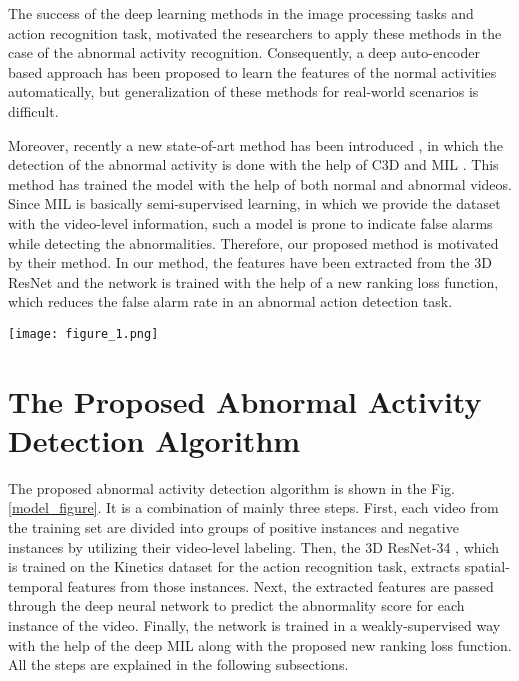 \documentclass[conference]{IEEEtran}
\begin{document}
The success of the deep learning methods in the image processing tasks \cite{A5} and action recognition \cite{A14, A13, A5} task, motivated the researchers to apply these methods in the case of the abnormal activity recognition. Consequently, a deep auto-encoder based approach \cite{A11,A15,A16} has been proposed to learn the features of the normal activities automatically, but generalization of these methods for real-world scenarios is difficult.

Moreover, recently a new state-of-art method has been introduced \cite{A6}, in which the detection of the abnormal activity is done with the help of C3D \cite{A1} and MIL \cite{A12,A24}. This method has trained the model with the help of both normal and abnormal videos. Since MIL is basically semi-supervised learning, in which we provide the dataset with the video-level information, such a model is prone to indicate false alarms while detecting the abnormalities. Therefore, our proposed method is motivated by their method. In our method, the features have been extracted from the 3D ResNet \cite{A5,A13} and the network is trained with the help of a new ranking loss function, which reduces the false alarm rate in an abnormal action detection task.  



\begin{figure*}

	\begin{center}
		\texttt{[image: figure\_1.png]}
		
	\end{center}
	\caption{The model of the proposed abnormal activity detection algorithm. Each normal and abnormal videos is divided into groups of positive instances and negative instances. Then the proposed neural network predicts the abnormality score for each instance with the help of MIL along with the new ranking loss.}
	\label{model_figure}
	
\end{figure*}
 
\section{The Proposed Abnormal Activity Detection Algorithm} \label{pa}
The proposed abnormal activity detection algorithm is shown in the Fig. \ref{model_figure}. It is a combination of mainly three steps. First, each video from the training set are divided into groups of positive instances and negative instances by utilizing their video-level labeling. Then, the 3D ResNet-34 \cite{A5,A13}, which is trained on the Kinetics dataset \cite{A23} for the action recognition task, extracts spatial-temporal features from those instances. Next, the extracted features are passed through the deep neural network to predict the abnormality score for each instance of the video. Finally, the network is trained in a weakly-supervised way with the help of the deep MIL \cite{A12,A24} along with the proposed new ranking loss function. All the steps are explained in the following subsections.
\end{document}
